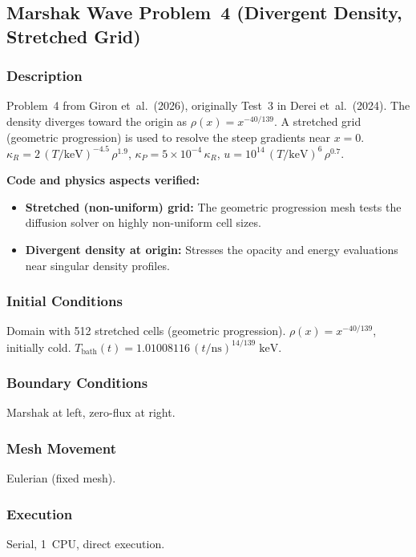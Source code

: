 \documentclass[11pt,a4paper]{article}
\begin{document}
\newpage

\subsection{Marshak Wave Problem~4 (Divergent Density, Stretched Grid)}
\label{sec:marshak_wave_4_diffusion}

\subsubsection*{Description}
Problem~4 from Giron et~al.\ (2026), originally Test~3 in Derei et~al.\ (2024). The density diverges toward the origin as $\rho(x) = x^{-40/139}$. A stretched grid (geometric progression) is used to resolve the steep gradients near $x=0$. $\kappa_R = 2\,(T/\mathrm{keV})^{-4.5}\,\rho^{1.9}$, $\kappa_P = 5{\times}10^{-4}\,\kappa_R$, $u = 10^{14}\,(T/\mathrm{keV})^{6}\,\rho^{0.7}$.

\textbf{Code and physics aspects verified:}
\begin{itemize}
  \item \textbf{Stretched (non-uniform) grid:} The geometric progression mesh tests the diffusion solver on highly non-uniform cell sizes.
  \item \textbf{Divergent density at origin:} Stresses the opacity and energy evaluations near singular density profiles.
\end{itemize}

\subsubsection*{Initial Conditions}
Domain with 512 stretched cells (geometric progression). $\rho(x) = x^{-40/139}$, initially cold. $T_{\mathrm{bath}}(t) = 1.01008116\,(t/\mathrm{ns})^{14/139}\;\mathrm{keV}$.

\subsubsection*{Boundary Conditions}
Marshak at left, zero-flux at right.

\subsubsection*{Mesh Movement}
Eulerian (fixed mesh).

\subsubsection*{Execution}
Serial, 1~CPU, direct execution.
\end{document}
